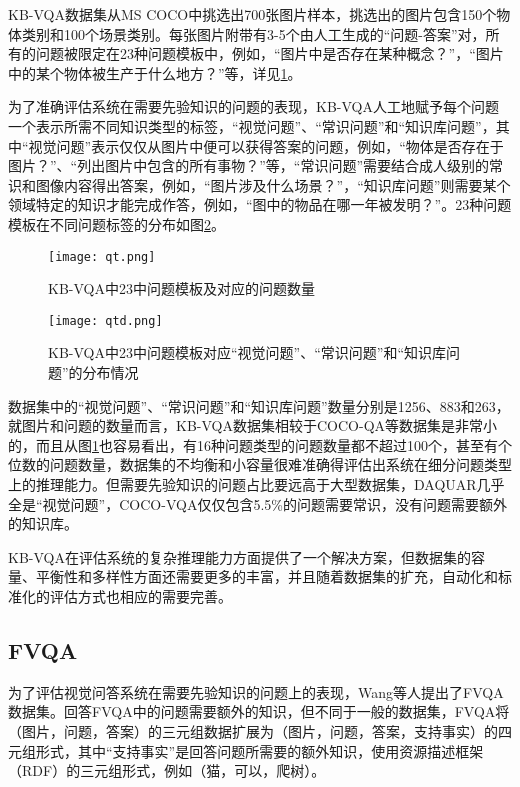 KB-VQA数据集从MS COCO中挑选出700张图片样本，挑选出的图片包含150个物体类别和100个场景类别。每张图片附带有3-5个由人工生成的“问题-答案”对，所有的问题被限定在23种问题模板中，例如，“图片中是否存在某种概念？”，“图片中的某个物体被生产于什么地方？”等，详见\ref{qt}。

为了准确评估系统在需要先验知识的问题的表现，KB-VQA人工地赋予每个问题一个表示所需不同知识类型的标签，“视觉问题”、“常识问题”和“知识库问题”，其中“视觉问题”表示仅仅从图片中便可以获得答案的问题，例如，“物体是否存在于图片？”、“列出图片中包含的所有事物？”等，“常识问题”需要结合成人级别的常识和图像内容得出答案，例如，“图片涉及什么场景？”，“知识库问题”则需要某个领域特定的知识才能完成作答，例如，“图中的物品在哪一年被发明？”。23种问题模板在不同问题标签的分布如图\ref{qtd}。
\begin{figure}[H]
	\centering
	\texttt{[image: qt.png]}
	\caption{KB-VQA中23中问题模板及对应的问题数量}
	\label{qt}
\end{figure}
\begin{figure}[H]
	\centering
	\texttt{[image: qtd.png]}
	\caption{KB-VQA中23中问题模板对应“视觉问题”、“常识问题”和“知识库问题”的分布情况}
	\label{qtd}
\end{figure}

数据集中的“视觉问题”、“常识问题”和“知识库问题”数量分别是1256、883和263，就图片和问题的数量而言，KB-VQA数据集相较于COCO-QA等数据集是非常小的，而且从图\ref{qt}也容易看出，有16种问题类型的问题数量都不超过100个，甚至有个位数的问题数量，数据集的不均衡和小容量很难准确得评估出系统在细分问题类型上的推理能力。但需要先验知识的问题占比要远高于大型数据集，DAQUAR几乎全是“视觉问题”，COCO-VQA仅仅包含5.5\%的问题需要常识，没有问题需要额外的知识库。

KB-VQA在评估系统的复杂推理能力方面提供了一个解决方案，但数据集的容量、平衡性和多样性方面还需要更多的丰富，并且随着数据集的扩充，自动化和标准化的评估方式也相应的需要完善。

\subsection{FVQA}
为了评估视觉问答系统在需要先验知识的问题上的表现，Wang等人提出了FVQA数据集。回答FVQA中的问题需要额外的知识，但不同于一般的数据集，FVQA将（图片，问题，答案）的三元组数据扩展为（图片，问题，答案，支持事实）的四元组形式，其中“支持事实”是回答问题所需要的额外知识，使用资源描述框架（RDF）的三元组形式，例如（猫，可以，爬树）。

